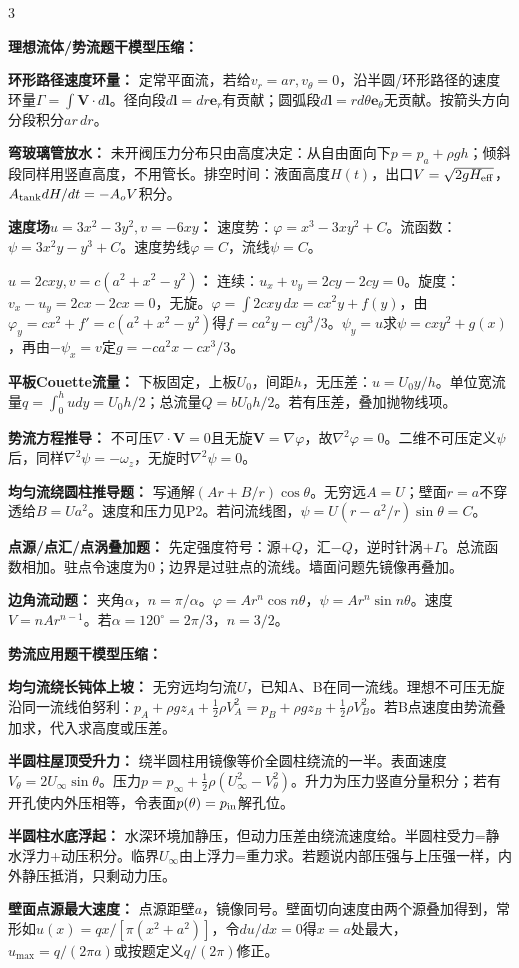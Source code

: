 \documentclass[a4paper]{article}
\newcommand{\sect}[1]{\par{\bfseries\color{Q}#1：}}
\begin{document}
\begin{multicols}{3}
{\sect{理想流体/势流题干模型压缩}
\sect{环形路径速度环量}
定常平面流，若给$v_r=ar,v_\theta=0$，沿半圆/环形路径的速度环量$\Gamma=\int\bm V\cdot d\bm l$。径向段$d\bm l=dr\bm e_r$有贡献；圆弧段$d\bm l=rd\theta\bm e_\theta$无贡献。按箭头方向分段积分$ar\,dr$。
\sect{弯玻璃管放水}
未开阀压力分布只由高度决定：从自由面向下$p=p_a+\rho gh$；倾斜段同样用竖直高度，不用管长。排空时间：液面高度$H(t)$，出口$V=\sqrt{2gH_{\rm eff}}$，$A_{\rm tank}dH/dt=-A_oV$积分。
\sect{速度场$u=3x^2-3y^2,v=-6xy$}
速度势：$\varphi=x^3-3xy^2+C$。流函数：$\psi=3x^2y-y^3+C$。速度势线$\varphi=C$，流线$\psi=C$。
\sect{$u=2cxy,v=c(a^2+x^2-y^2)$}
连续：$u_x+v_y=2cy-2cy=0$。旋度：$v_x-u_y=2cx-2cx=0$，无旋。$\varphi=\int2cxy\,dx=cx^2y+f(y)$，由$\varphi_y=cx^2+f'=c(a^2+x^2-y^2)$得$f=ca^2y-cy^3/3$。$\psi_y=u$求$\psi=cxy^2+g(x)$，再由$-\psi_x=v$定$g=-ca^2x-cx^3/3$。
\sect{平板Couette流量}
下板固定，上板$U_0$，间距$h$，无压差：$u=U_0y/h$。单位宽流量$q=\int_0^h udy=U_0h/2$；总流量$Q=bU_0h/2$。若有压差，叠加抛物线项。
\sect{势流方程推导}
不可压$\nabla\cdot\bm V=0$且无旋$\bm V=\nabla\varphi$，故$\nabla^2\varphi=0$。二维不可压定义$\psi$后，同样$\nabla^2\psi=-\omega_z$，无旋时$\nabla^2\psi=0$。
\sect{均匀流绕圆柱推导题}
写通解$(Ar+B/r)\cos\theta$。无穷远$A=U$；壁面$r=a$不穿透给$B=Ua^2$。速度和压力见P2。若问流线图，$\psi=U(r-a^2/r)\sin\theta=C$。
\sect{点源/点汇/点涡叠加题}
先定强度符号：源$+Q$，汇$-Q$，逆时针涡$+\Gamma$。总流函数相加。驻点令速度为0；边界是过驻点的流线。墙面问题先镜像再叠加。
\sect{边角流动题}
夹角$\alpha$，$n=\pi/\alpha$。$\varphi=Ar^n\cos n\theta$，$\psi=Ar^n\sin n\theta$。速度$V=nAr^{n-1}$。若$\alpha=120^\circ=2\pi/3$，$n=3/2$。

\sect{势流应用题干模型压缩}
\sect{均匀流绕长钝体上坡}
无穷远均匀流$U$，已知A、B在同一流线。理想不可压无旋沿同一流线伯努利：$p_A+\rho gz_A+\frac12\rho V_A^2=p_B+\rho gz_B+\frac12\rho V_B^2$。若B点速度由势流叠加求，代入求高度或压差。
\sect{半圆柱屋顶受升力}
绕半圆柱用镜像等价全圆柱绕流的一半。表面速度$V_\theta=2U_\infty\sin\theta$。压力$p=p_\infty+\frac12\rho(U_\infty^2-V_\theta^2)$。升力为压力竖直分量积分；若有开孔使内外压相等，令表面$p(\theta)=p_{\rm in}$解孔位。
\sect{半圆柱水底浮起}
水深环境加静压，但动力压差由绕流速度给。半圆柱受力=静水浮力+动压积分。临界$U_\infty$由上浮力=重力求。若题说内部压强与上压强一样，内外静压抵消，只剩动力压。
\sect{壁面点源最大速度}
点源距壁$a$，镜像同号。壁面切向速度由两个源叠加得到，常形如$u(x)=q x/[\pi(x^2+a^2)]$，令$du/dx=0$得$x=a$处最大，$u_{\max}=q/(2\pi a)$或按题定义$q/(2\pi)$修正。

}
\end{multicols}
\end{document}
